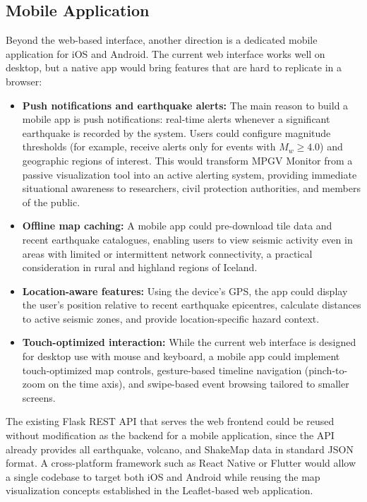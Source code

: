 \documentclass[12pt]{article}
\begin{document}
\subsection{Mobile Application}

Beyond the web-based interface, another direction is a dedicated mobile application for iOS and Android. The current web interface works well on desktop, but a native app would bring features that are hard to replicate in a browser:

\begin{itemize}
    \item \textbf{Push notifications and earthquake alerts:} The main reason to build a mobile app is push notifications: real-time alerts whenever a significant earthquake is recorded by the system. Users could configure magnitude thresholds (for example, receive alerts only for events with $M_w \geq 4.0$) and geographic regions of interest. This would transform MPGV Monitor from a passive visualization tool into an active alerting system, providing immediate situational awareness to researchers, civil protection authorities, and members of the public.
    \item \textbf{Offline map caching:} A mobile app could pre-download tile data and recent earthquake catalogues, enabling users to view seismic activity even in areas with limited or intermittent network connectivity, a practical consideration in rural and highland regions of Iceland.
    \item \textbf{Location-aware features:} Using the device's GPS, the app could display the user's position relative to recent earthquake epicentres, calculate distances to active seismic zones, and provide location-specific hazard context.
    \item \textbf{Touch-optimized interaction:} While the current web interface is designed for desktop use with mouse and keyboard, a mobile app could implement touch-optimized map controls, gesture-based timeline navigation (pinch-to-zoom on the time axis), and swipe-based event browsing tailored to smaller screens.
\end{itemize}

The existing Flask REST API that serves the web frontend could be reused without modification as the backend for a mobile application, since the API already provides all earthquake, volcano, and ShakeMap data in standard JSON format. A cross-platform framework such as React Native or Flutter would allow a single codebase to target both iOS and Android while reusing the map visualization concepts established in the Leaflet-based web application.
\end{document}
